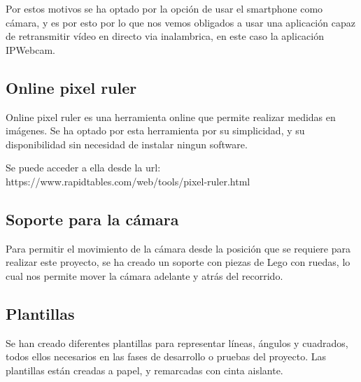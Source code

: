 Por estos motivos se ha optado por la opción de usar el smartphone como cámara, y es por esto por lo que nos vemos obligados a usar una aplicación capaz de retransmitir vídeo en directo via inalambrica, en este caso la aplicación IPWebcam.

\subsection{Online pixel ruler}
Online pixel ruler es una herramienta online que permite realizar medidas en imágenes. Se ha optado por esta herramienta por su simplicidad, y su disponibilidad sin necesidad de instalar ningun software. 

Se puede acceder a ella desde la url: https://www.rapidtables.com/web/tools/pixel-ruler.html


\subsection{Soporte para la cámara}
Para permitir el movimiento de la cámara desde la posición que se requiere para realizar este proyecto, se ha creado un soporte con piezas de Lego con ruedas, lo cual nos permite mover la cámara adelante y atrás del recorrido.
 
\subsection{Plantillas}
Se han creado diferentes plantillas para representar líneas, ángulos y cuadrados, todos ellos necesarios en las fases de desarrollo o pruebas del proyecto. Las plantillas están creadas a papel, y remarcadas con cinta aislante.

